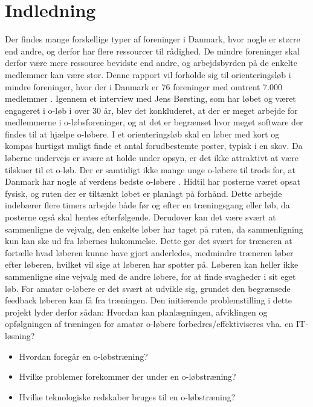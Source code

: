 \chapter{Indledning}
Der findes mange forskellige typer af foreninger i Danmark, hvor nogle er større end andre, og derfor har flere ressourcer til rådighed. De mindre foreninger skal derfor være mere ressource bevidste end andre, og arbejdsbyrden på de enkelte medlemmer kan være stor.\newline
Denne rapport vil forholde sig til orienteringsløb i mindre foreninger, hvor der i Danmark er 76 foreninger med omtrent 7.000 medlemmer \citep{DIF}. Igennem et interview med Jens Børsting, som har løbet og været engageret i o-løb i over 30 år, blev det konkluderet, at der er meget arbejde for medlemmerne i o-løbsforeninger, og at det er begrænset hvor meget software der findes til at hjælpe o-løbere. \newline
I et orienteringsløb skal en løber med kort og kompas hurtigst muligt finde et antal forudbestemte poster, typisk i en skov. Da løberne undervejs er svære at holde under opsyn, er det ikke attraktivt at være tilskuer til et o-løb. Der er samtidigt ikke mange unge o-løbere til trods for, at Danmark har nogle af verdens bedste o-løbere \citep{RANK}. \newline
Hidtil har posterne været opsat fysisk, og ruten der er tiltænkt løbet er planlagt på forhånd. Dette arbejde indebærer flere timers arbejde både før og efter en træningsgang eller løb, da posterne også skal hentes efterfølgende. Derudover kan det være svært at sammenligne de vejvalg, den enkelte løber har taget på ruten, da sammenligning kun kan ske ud fra løbernes hukommelse. Dette gør det svært for træneren at fortælle hvad løberen kunne have gjort anderledes, medmindre træneren løber efter løberen, hvilket vil sige at løberen har spotter på. Løberen kan heller ikke sammenligne sine vejvalg med de andre løbere, for at finde svagheder i sit eget løb.\newline 
For amatør o-løbere er det svært at udvikle sig, grundet den begrænsede feedback løberen kan få fra træningen.\newline
Den initierende problemstilling i dette projekt lyder derfor sådan:\newline
Hvordan kan planlægningen, afviklingen og opfølgningen af træningen for amatør o-løbere forbedres/effektiviseres vha. en IT-løsning?
\begin{itemize}
	\item Hvordan foregår en o-løbstræning?
	\item Hvilke problemer forekommer der under en o-løbstræning?
	\item Hvilke teknologiske redskaber bruges til en o-løbstræning?	
\end{itemize} 


